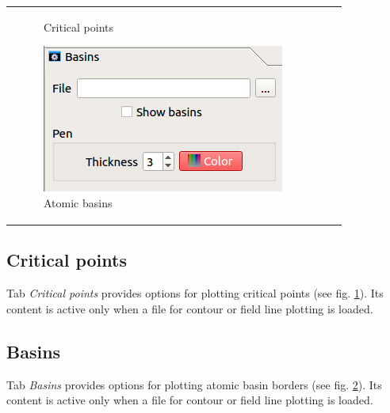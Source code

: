 \documentclass[10pt]{article}
\begin{document}
\begin{tabular}{lcr}
\begin{minipage}{.3\linewidth}
\begin{figure}[H]
\begin{center}
    \end{center}
    \vspace*{2mm}
    \caption{Critical points \label{fig:3_7}}
\end{figure}
\end{minipage}
\begin{minipage}{.3\linewidth}
\begin{figure}[H]
    \begin{center}
        \includegraphics[width=0.9\linewidth]{damqt_fig_3_8.png}
    \end{center}
    \vspace*{10mm}
    \caption{Atomic basins \label{fig:3_8}}
\end{figure}
\end{minipage}
\end{tabular}



\subsection{Critical points \label{sec:3.5}}

Tab {\it Critical points} provides options for plotting critical points  
(see fig. \ref{fig:3_7}). Its content is active only when a file  
for contour or field line plotting is loaded.  

\subsection{Basins \label{sec:3.6}}

Tab {\it Basins} provides options for plotting atomic basin borders  
(see fig. \ref{fig:3_8}). Its content is active only when a file  
for contour or field line plotting is loaded.  
\end{document}
